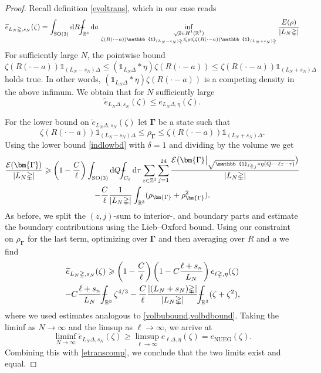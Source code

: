 \documentclass[final,onefignum,onetabnum,reqno]{amsart}
\theoremstyle{remark}
\renewcommand{\le}{\leqslant}
\renewcommand{\ge}{\geqslant}
\newcommand{\wt}[1]{\widetilde{#1}}
\newcommand{\RR}{\mathbb{R}}
\newcommand{\ZZ}{\mathbb{Z}}
\newcommand{\vGamma}{{\bm{\Gamma}}} %
\newcommand{\SO}{\mathrm{SO}}
\newcommand{\NUEG}{\mathrm{NUEG}} %
\newcommand{\iden}{\mathbb{1}} %
\newcommand{\tetra}{\mathbb{\Delta}} %
\newcommand{\dd}{\mathrm{d}} %
\def\Xint#1{\mathchoice
{\XXint\displaystyle\textstyle{#1}}%
{\XXint\textstyle\scriptstyle{#1}}%
{\XXint\scriptstyle\scriptscriptstyle{#1}}%
{\XXint\scriptscriptstyle\scriptscriptstyle{#1}}%
\!\int}
\def\XXint#1#2#3{{\setbox0=\hbox{$#1{#2#3}{\int}$ }
\vcenter{\hbox{$#2#3$ }}\kern-.6\wd0}}
\def\dashint{\Xint-}
\newcommand{\EC}{\mathcal{E}}
\begin{document}
\begin{proof}
Recall definition \cref{evoltrans}, which in our case reads
$$
\wt{e}_{L_N\tetra,s_N}(\zeta)=\int_{\SO(3)}\dd  R \dashint_{\RR^3}\dd a\, \inf_{\substack{\sqrt{\rho}\in H^1(\RR^3)\\ \zeta(R(\cdot-a))\iden_{(L_N-s_N)\tetra}\le \rho \le \zeta(R(\cdot-a))\iden_{(L_N+s_N)\tetra} }} \frac{E(\rho)}{|L_N\tetra|}
$$
For sufficiently large $N$, the pointwise bound
$$
\zeta(R(\cdot-a))\iden_{(L_N-s_N)\tetra}\le (\iden_{L_N\tetra}*\eta)\zeta(R(\cdot-a)) \le \zeta(R(\cdot-a))\iden_{(L_N+s_N)\tetra}
$$
holds true. In other words, $(\iden_{L_N\tetra}*\eta)\zeta(R(\cdot-a))$ is a competing density in the above infimum.
 We obtain that for $N$ sufficiently large
\begin{equation}\label{etranscomp}
\wt{e}_{L_N\tetra,s_N}(\zeta)\le e_{L_N\tetra,\eta}(\zeta).
\end{equation}

For the lower bound on $\wt{e}_{L_N\tetra,s_N}(\zeta)$ let $\vGamma$ be a state such that
$$
\zeta(R(\cdot-a))\iden_{(L_N-s_N)\tetra}\le \rho_{\vGamma} \le \zeta(R(\cdot-a))\iden_{(L_N+s_N)\tetra}.
$$
Using the lower bound \cref{indlowbd} with $\delta=1$ and dividing by the volume we get
\begin{multline*}
\frac{\EC(\vGamma)}{|L_N\tetra|}\ge \left(1-\frac{C}{\ell}\right) \int_{\SO(3)}\dd Q  \dashint_{C_{\ell}}\dd \tau
\sum_{z\in\ZZ^3} \sum_{j=1}^{24} \frac{\EC\bigl({\vGamma\bigr|}_{\sqrt{\iden_{\ell\tetra_j} * \eta(Q\cdot - \ell z - \tau)}}\bigr)}{|L_N\tetra|}\\
 -\frac{C}{\ell} \frac{1}{|L_N\tetra|}\int_{\RR^3} (\rho_\vGamma + \rho_\vGamma^2 ).
\end{multline*}
As before, we split the $(z,j)$-sum to interior-, and boundary parts and estimate the boundary contributions using the Lieb--Oxford bound. 
Using our constraint on $\rho_\vGamma$ for the last term, optimizing over $\vGamma$ and then averaging over $R$ and $a$ we find
\begin{multline*}
\wt{e}_{L_N\tetra,s_N}(\zeta)\ge \left(1-\frac{C}{\ell}\right) \left(1-C\frac{\ell+s_n}{L_N}\right) e_{\ell\tetra,\eta}(\zeta)\\
- C\frac{\ell+s_n}{L_N} \dashint_{\RR^3} \zeta^{4/3}
- \frac{C}{\ell} \frac{|(L_N+s_N)\tetra|}{|L_N\tetra|}\dashint_{\RR^3}(\zeta+\zeta^2),
\end{multline*}
where we used estimates analogous to \cref{volbubound,volbdbound}. Taking the liminf as $N\to\infty$ and the limsup as $\ell\to\infty$, we arrive at
$$
\liminf_{N\to\infty} \wt{e}_{L_N\tetra,s_N}(\zeta)\ge \limsup_{\ell\to\infty} e_{\ell\tetra,\eta}(\zeta)= e_\NUEG(\zeta).
$$
Combining this with \cref{etranscomp}, we conclude that the two limits exist and equal.
\end{proof}
\end{document}
